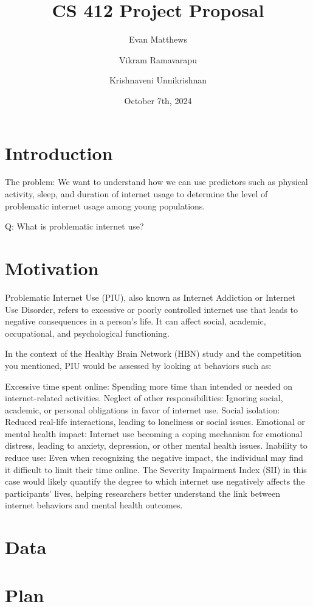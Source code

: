 \documentclass[12pt]{extarticle}
\title{CS 412 Project Proposal}
\author[1]{Evan Matthews}
\author[1]{Vikram Ramavarapu}
\author[1]{Krishnaveni Unnikrishnan}
\affil[1]{University of Illinois Urbana-Champaign}
\date{October 7th, 2024}
\begin{document}
\maketitle

\section{Introduction}

The problem: We want to understand how we can use predictors such as physical activity, sleep, and duration of internet usage to determine the level of problematic internet usage among young populations.

Q: What is problematic internet use? 

\section{Motivation}

Problematic Internet Use (PIU), also known as Internet Addiction or Internet Use Disorder, refers to excessive or poorly controlled internet use that leads to negative consequences in a person's life. It can affect social, academic, occupational, and psychological functioning.

In the context of the Healthy Brain Network (HBN) study and the competition you mentioned, PIU would be assessed by looking at behaviors such as:

Excessive time spent online: Spending more time than intended or needed on internet-related activities.
Neglect of other responsibilities: Ignoring social, academic, or personal obligations in favor of internet use.
Social isolation: Reduced real-life interactions, leading to loneliness or social issues.
Emotional or mental health impact: Internet use becoming a coping mechanism for emotional distress, leading to anxiety, depression, or other mental health issues.
Inability to reduce use: Even when recognizing the negative impact, the individual may find it difficult to limit their time online.
The Severity Impairment Index (SII) in this case would likely quantify the degree to which internet use negatively affects the participants' lives, helping researchers better understand the link between internet behaviors and mental health outcomes.

\section{Data}

\section{Plan}



\end{document}
